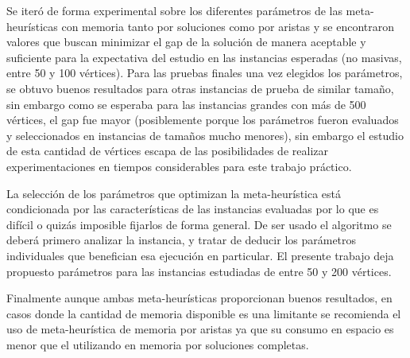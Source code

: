 \documentclass[10pt,a4paper]{article}
\begin{document}
Se iteró de forma experimental sobre los diferentes parámetros de las meta-heurísticas con memoria tanto por soluciones como por aristas y se encontraron valores que buscan minimizar el gap de la solución de manera aceptable y suficiente para la expectativa del estudio en las instancias esperadas (no masivas, entre 50 y 100 vértices). 
Para las pruebas finales una vez elegidos los parámetros, se obtuvo buenos resultados para otras instancias de prueba de similar tamaño, sin embargo como se esperaba para las instancias grandes con más de 500 vértices, el gap fue mayor (posiblemente porque los parámetros fueron evaluados y seleccionados en instancias de tamaños mucho menores), sin embargo el estudio de esta cantidad de vértices escapa de las posibilidades de realizar experimentaciones en tiempos considerables para este trabajo práctico. 

La selección de los parámetros que optimizan la meta-heurística está condicionada por las características de las instancias evaluadas por lo que es difícil o quizás imposible fijarlos de forma general. De ser usado el algoritmo se deberá primero analizar la instancia, y tratar de deducir los parámetros individuales que benefician esa ejecución en particular. El presente trabajo deja propuesto parámetros para las instancias estudiadas de entre 50 y 200 vértices.

Finalmente aunque ambas meta-heurísticas proporcionan buenos resultados, en casos donde la cantidad de memoria disponible es una limitante se recomienda el uso de meta-heurística de memoria por aristas ya que su consumo en espacio es menor que el utilizando en memoria por soluciones completas. 

\newpage


\end{document}
